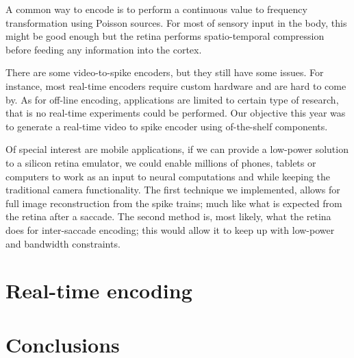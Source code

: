 A common way to encode is to perform a continuous value to frequency transformation using Poisson sources. For most of sensory input in the body, this might be good enough but the retina performs spatio-temporal compression before feeding any information into the cortex.

There are some video-to-spike encoders, but they still have some issues. For instance, most real-time encoders require custom hardware and are hard to come by. As for off-line encoding, applications are limited to certain type of research, that is no real-time experiments could be performed. Our objective this year was to generate a real-time video to spike encoder using of-the-shelf components. 

Of special interest are mobile applications, if we can provide a low-power solution to a silicon retina emulator, we could enable millions of phones, tablets or computers to work as an input to neural computations and while keeping the traditional camera functionality. The first technique we implemented, allows for full image reconstruction from the spike trains; much like what is expected from the retina after a saccade. The second method is, most likely, what the retina does for inter-saccade encoding; this would allow it to keep up with low-power and bandwidth constraints.

\section{Real-time encoding}

%

%
\section{Conclusions}
